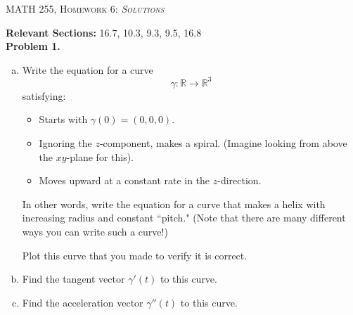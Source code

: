 \documentclass[12pt]{report} %
\newcommand{\R}{\mathbb{R}}
\theoremstyle{definition}
\begin{document}
\begin{center}
   \textsc{\large MATH 255, Homework 6: \emph{Solutions}}\\
\end{center}
\vspace{.5cm}

\noindent\textbf{Relevant Sections:} 16.7, 10.3, 9.3, 9.5, 16.8 \\

\noindent\textbf{Problem 1.} 
\begin{enumerate}[(a)]
    \item Write the equation for a curve 
    \[
    \gamma \colon \R \to \R^3
    \] 
    satisfying:
    \begin{itemize}
    \item Starts with $\gamma(0)=(0,0,0)$.
    \item Ignoring the $z$-component, makes a spiral. (Imagine looking from above the $xy$-plane for this).
    \item Moves upward at a constant rate in the $z$-direction.
\end{itemize}
In other words, write the equation for a curve that makes a helix with increasing radius and constant ``pitch." (Note that there are many different ways you can write such a curve!)

Plot this curve that you made to verify it is correct.
    \item Find the tangent vector $\gamma'(t)$ to this curve.
    \item Find the acceleration vector $\gamma''(t)$ to this curve.
\end{enumerate}
\end{document}
